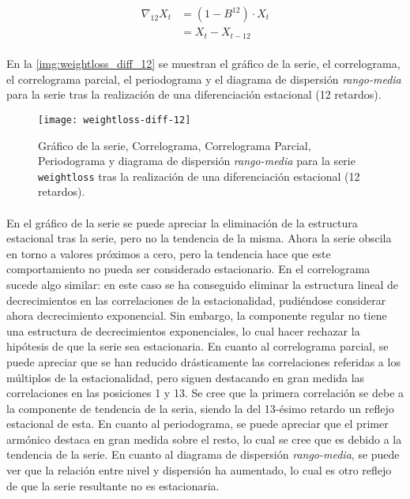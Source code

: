 \documentclass[a4paper, spanish]{article}
\begin{document}
        \begin{equation}
        \label{eq:diff_12}
          \begin{split}
            \nabla_{12} X_t
            &= (1 - B^12) \cdot X_t \\
            &= X_t - X_{t - 12}
          \end{split}
        \end{equation}

        \paragraph{}
        En la \autoref{img:weightloss_diff_12} se muestran el gráfico de la serie, el correlograma, el correlograma parcial, el periodograma y el diagrama de dispersión \emph{rango-media} para la serie tras la realización de una diferenciación estacional (12 retardos).

        \begin{figure}[htb!]
          \texttt{[image: weightloss-diff-12]}
          \caption{Gráfico de la serie, Correlograma, Correlograma Parcial, Periodograma y diagrama de dispersión \emph{rango-media} para la serie \texttt{weightloss} tras la realización de una diferenciación estacional (12 retardos).}
          \label{img:weightloss_diff_12}
        \end{figure}

        \paragraph{}
        En el gráfico de la serie se puede apreciar la eliminación de la estructura estacional tras la serie, pero no la tendencia de la misma. Ahora la serie obscila en torno a valores próximos a cero, pero la tendencia hace que este comportamiento no pueda ser considerado estacionario. En el correlograma sucede algo similar: en este caso se ha conseguido eliminar la estructura lineal de decrecimientos en las correlaciones de la estacionalidad, pudiéndose considerar ahora decrecimiento exponencial. Sin embargo, la componente regular no tiene una estructura de decrecimientos exponenciales, lo cual hacer rechazar la hipótesis de que la serie sea estacionaria. En cuanto al correlograma parcial, se puede apreciar que se han reducido drásticamente las correlaciones referidas a los múltiplos de la estacionalidad, pero siguen destacando en gran medida las correlaciones en las posiciones 1 y 13. Se cree que la primera correlación se debe a la componente de tendencia de la seria, siendo la del 13-ésimo retardo un reflejo estacional de esta. En cuanto al periodograma, se puede apreciar que el primer armónico destaca en gran medida sobre el resto, lo cual se cree que es debido a la tendencia de la serie. En cuanto al diagrama de dispersión \emph{rango-media}, se puede ver que la relación entre nivel y dispersión ha aumentado, lo cual es otro reflejo de que la serie resultante no es estacionaria.
\end{document}
